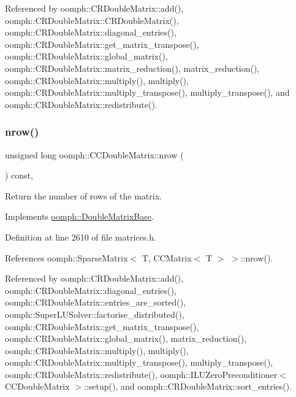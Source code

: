 Referenced by oomph\+::\+C\+R\+Double\+Matrix\+::add(), oomph\+::\+C\+R\+Double\+Matrix\+::\+C\+R\+Double\+Matrix(), oomph\+::\+C\+R\+Double\+Matrix\+::diagonal\+\_\+entries(), oomph\+::\+C\+R\+Double\+Matrix\+::get\+\_\+matrix\+\_\+transpose(), oomph\+::\+C\+R\+Double\+Matrix\+::global\+\_\+matrix(), oomph\+::\+C\+R\+Double\+Matrix\+::matrix\+\_\+reduction(), matrix\+\_\+reduction(), oomph\+::\+C\+R\+Double\+Matrix\+::multiply(), multiply(), oomph\+::\+C\+R\+Double\+Matrix\+::multiply\+\_\+transpose(), multiply\+\_\+transpose(), and oomph\+::\+C\+R\+Double\+Matrix\+::redistribute().

\mbox{\label{classoomph_1_1CCDoubleMatrix_ab541153fa5ab2c1bc18e5339bacadfb9}} 
\subsubsection{\texorpdfstring{nrow()}{nrow()}}
{\footnotesize\ttfamily unsigned long oomph\+::\+C\+C\+Double\+Matrix\+::nrow (\begin{DoxyParamCaption}{ }\end{DoxyParamCaption}) const\hspace{0.3cm}{\ttfamily [inline]}, {\ttfamily [virtual]}}



Return the number of rows of the matrix. 



Implements \hyperlink{classoomph_1_1DoubleMatrixBase_acdcd6e1ea2bf2380f1a2fa32c7829cb5}{oomph\+::\+Double\+Matrix\+Base}.



Definition at line 2610 of file matrices.\+h.



References oomph\+::\+Sparse\+Matrix$<$ T, C\+C\+Matrix$<$ T $>$ $>$\+::nrow().



Referenced by oomph\+::\+C\+R\+Double\+Matrix\+::add(), oomph\+::\+C\+R\+Double\+Matrix\+::diagonal\+\_\+entries(), oomph\+::\+C\+R\+Double\+Matrix\+::entries\+\_\+are\+\_\+sorted(), oomph\+::\+Super\+L\+U\+Solver\+::factorise\+\_\+distributed(), oomph\+::\+C\+R\+Double\+Matrix\+::get\+\_\+matrix\+\_\+transpose(), oomph\+::\+C\+R\+Double\+Matrix\+::global\+\_\+matrix(), matrix\+\_\+reduction(), oomph\+::\+C\+R\+Double\+Matrix\+::multiply(), multiply(), oomph\+::\+C\+R\+Double\+Matrix\+::multiply\+\_\+transpose(), multiply\+\_\+transpose(), oomph\+::\+C\+R\+Double\+Matrix\+::redistribute(), oomph\+::\+I\+L\+U\+Zero\+Preconditioner$<$ C\+C\+Double\+Matrix $>$\+::setup(), and oomph\+::\+C\+R\+Double\+Matrix\+::sort\+\_\+entries().

